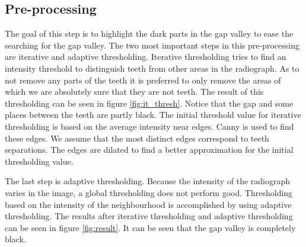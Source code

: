 \documentclass[a4paper,10pt]{article}
\begin{document}
\subsection{Pre-processing}
The goal of this step is to highlight the dark parts in the gap valley to ease the searching for the gap valley. The two most important steps in this pre-processing are iterative and adaptive thresholding. Iterative thresholding tries to find an intensity threshold to distinguish teeth from other areas in the radiograph. As to not remove any parts of the teeth it is preferred to only remove the areas of which we are absolutely sure that they are not teeth. The result of this thresholding can be seen in figure \ref{fig:it_thresh}. Notice that the gap and some places between the teeth are partly black. The initial threshold value for iterative thresholding is based on the average intensity near edges. Canny is used to find these edges. We assume that the most distinct edges correspond to teeth separations. The edges are dilated to find a better approximation for the initial thresholding value.

The last step is adaptive thresholding. Because the intensity of the radiograph varies in the image, a global thresholding does not perform good. Thresholding based on the intensity of the neighbourhood is accomplished by using adaptive thresholding. The results after iterative thresholding and adaptive thresholding can be seen in figure \ref{fig:result}. It can be seen that the gap valley is completely black.
\end{document}

